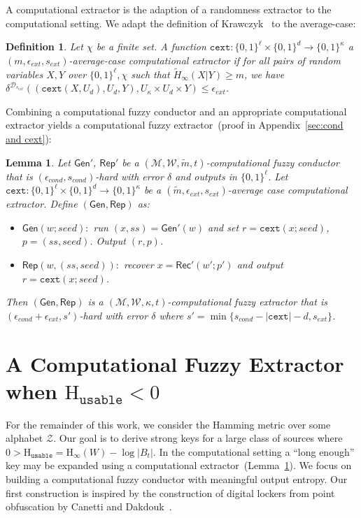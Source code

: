 \documentclass[11pt]{article}
\newcommand{\apref}[1]{\mbox{Appendix~\ref{#1}}}
\newcommand{\lemref}[1]{\mbox{Lemma~\ref{#1}}}
\newcommand{\class}[1]{{\ensuremath{\mathsf{#1}}}}
\newcommand{\gen}{\ensuremath{\class{Gen}}\xspace}
\newcommand{\rep}{\ensuremath{\class{Rep}}\xspace}
\newcommand{\rec}{\ensuremath{\class{Rec}}\xspace}
\newcommand{\zo}{\ensuremath{\{0, 1\}}}
\newcommand{\Hoo}{\mathrm{H}_\infty}
\newcommand{\Huse}{\mathrm{H}_{\mathtt{usable}}}
\newcommand{\cext}{\ensuremath{\mathtt{cext}}}
\newtheorem{lemma}[theorem]{Lemma}
\newtheorem{definition}[theorem]{Definition}
\begin{document}
A computational extractor is the adaption of a randomness extractor to the computational setting.  We adapt the definition of Krawczyk~\cite{krawczyk2010cryptographic} to the average-case:
\begin{definition}
Let $\chi$ be a finite set.
A function $\cext: \zo^\ell \times \{0,1\}^d \rightarrow \{0,1\}^\kappa$ a \emph{$(m, \epsilon_{ext}, s_{ext})$-average-case computational extractor} if for all pairs
of random variables $X, Y$ over $\zo^\ell, \chi$ such that
$\tilde{H}_\infty(X|Y) \ge m$, we have $\delta^{\mathcal{D}_{s_{ext}}}((\cext(X, U_d), U_d, Y), U_\kappa\times
U_d \times Y) \le \epsilon_{ext}$.
\end{definition}

Combining a computational fuzzy conductor and an appropriate computational extractor yields a computational fuzzy extractor~(proof in \apref{sec:cond and cext}):

\begin{lemma}
\label{lem:cond and cext}
Let $\gen'$, $\rep'$ be a $(\mathcal{M}, \mathcal{W}, \tilde{m}, t)$-computational fuzzy conductor that is $(\epsilon_{cond}, s_{cond})$-hard with error $\delta$ and outputs in $\zo^\ell$.  Let $\cext:\zo^\ell\times \zo^d\rightarrow \zo^\kappa$ be a $(\tilde{m}, \epsilon_{ext}, s_{ext})$-average case computational extractor.  Define $(\gen, \rep)$ as:
\begin{itemize}
\item $\gen(w; seed):$ run $(x, ss)= \gen'(w)$ and set $r = \cext(x; seed)$, $p = (ss, seed)$.  Output $(r, p)$.
\item $\rep(w, (ss, seed)):$ recover $x = \rec'(w'; p')$ and output $r = \cext(x; seed)$.
\end{itemize}
Then $(\gen, \rep)$ is a $(\mathcal{M}, \mathcal{W}, \kappa, t)$-computational fuzzy extractor that is $(\epsilon_{cond}+\epsilon_{ext}, s')$-hard with error $\delta$ where $s' = \min\{s_{cond} - |\cext| -d, s_{ext}\}$.
\end{lemma}


\section{A Computational Fuzzy Extractor when $\Huse<0$}
\label{sec:construction}
For the remainder of this work, we consider the Hamming metric over some alphabet $\mathcal{Z}$.  Our goal is to derive strong keys for a large class of sources where $0>\Huse = \Hoo(W) - \log|B_t|$.
In the computational setting a ``long enough'' key may be expanded using a computational extractor~(\lemref{lem:cond and cext}).  We focus on building a computational fuzzy conductor with meaningful output entropy.  Our first construction is inspired by the construction of digital lockers from point obfuscation by Canetti and Dakdouk~\cite{canetti2008obfuscating}.
\end{document}
